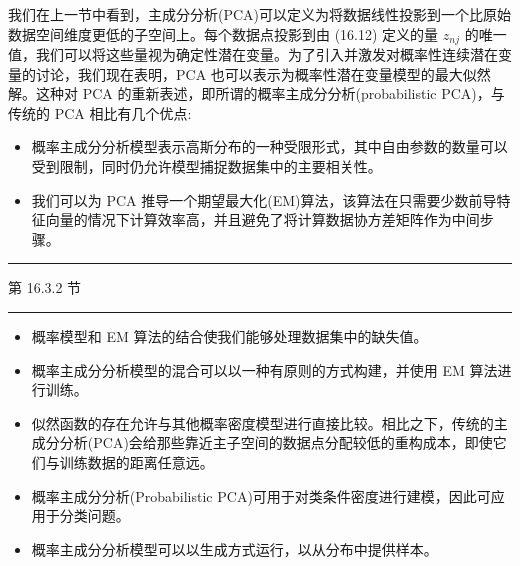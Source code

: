 \documentclass[10pt]{report}
\newcommand{\HRule}{\begin{center}\rule{0.9\linewidth}{0.2mm}\end{center}}
\begin{document}
我们在上一节中看到，主成分分析(PCA)可以定义为将数据线性投影到一个比原始数据空间维度更低的子空间上。每个数据点投影到由 (16.12) 定义的量 \({z}_{nj}\) 的唯一值，我们可以将这些量视为确定性潜在变量。为了引入并激发对概率性连续潜在变量的讨论，我们现在表明，PCA 也可以表示为概率性潜在变量模型的最大似然解。这种对 PCA 的重新表述，即所谓的概率主成分分析(probabilistic PCA)，与传统的 PCA 相比有几个优点:

\begin{itemize}
\item 概率主成分分析模型表示高斯分布的一种受限形式，其中自由参数的数量可以受到限制，同时仍允许模型捕捉数据集中的主要相关性。
\end{itemize}

\begin{itemize}
\item 我们可以为 PCA 推导一个期望最大化(EM)算法，该算法在只需要少数前导特征向量的情况下计算效率高，并且避免了将计算数据协方差矩阵作为中间步骤。
\end{itemize}

\HRule

第 16.3.2 节

\HRule

\begin{itemize}
\item 概率模型和 EM 算法的结合使我们能够处理数据集中的缺失值。
\end{itemize}

\begin{itemize}
\item 概率主成分分析模型的混合可以以一种有原则的方式构建，并使用 EM 算法进行训练。
\end{itemize}

\begin{itemize}
\item 似然函数的存在允许与其他概率密度模型进行直接比较。相比之下，传统的主成分分析(PCA)会给那些靠近主子空间的数据点分配较低的重构成本，即使它们与训练数据的距离任意远。
\end{itemize}

\begin{itemize}
\item 概率主成分分析(Probabilistic PCA)可用于对类条件密度进行建模，因此可应用于分类问题。
\end{itemize}

\begin{itemize}
\item 概率主成分分析模型可以以生成方式运行，以从分布中提供样本。
\end{itemize}
\end{document}
